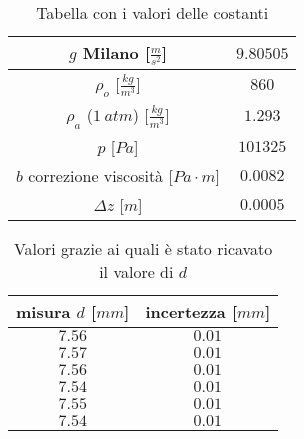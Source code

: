\documentclass{article}
\begin{document}
\begin{table}[H]
	\center
	\begin{tabular}{| c | c |}
		\hline
		$g$ Milano [$\frac m{s^2}$] & $9.80505$\\
		\hline
		$\rho_o$ [$\frac{kg}{m^3}$] & $860$\\
		\hline
		$\rho_a$ ($1\ atm$) [$\frac{kg}{m^3}$] & $1.293$\\
		\hline
		$p$ [$Pa$] & $101325$\\
		\hline
		$b$ correzione viscosità [$Pa\cdot m$] & $0.0082$\\
		\hline
		$\Delta z$ [$m$] & $0.0005$\\
		\hline
	\end{tabular}
	\caption{Tabella con i valori delle costanti}
\end{table}

\begin{table}[H]
	\center
	\begin{tabular}{| c | c |}
		\hline
		misura $d$ [$mm$] & incertezza [$mm$]\\
		\hline
		$7.56$ & $0.01$ \\
		$7.57$ & $0.01$ \\
		$7.56$ & $0.01$ \\
		$7.54$ & $0.01$ \\
		$7.55$ & $0.01$ \\
		$7.54$ & $0.01$ \\
		\hline
	\end{tabular}
	\caption{Valori grazie ai quali è stato ricavato il valore di $d$}
\end{table}
\end{document}
